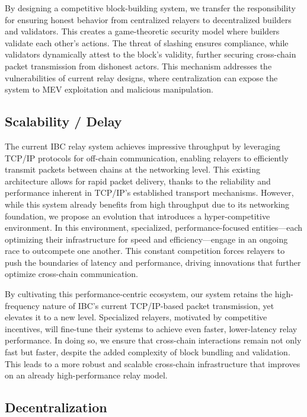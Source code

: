 \documentclass{article}
\begin{document}
By designing a competitive block-building system, we transfer the responsibility for ensuring honest behavior from centralized relayers to decentralized builders and validators. This creates a game-theoretic security model where builders validate each other's actions. The threat of slashing ensures compliance, while validators dynamically attest to the block's validity, further securing cross-chain packet transmission from dishonest actors. This mechanism addresses the vulnerabilities of current relay designs, where centralization can expose the system to MEV exploitation and malicious manipulation.

\subsection{Scalability / Delay}

The current IBC relay system achieves impressive throughput by leveraging TCP/IP protocols for off-chain communication, enabling relayers to efficiently transmit packets between chains at the networking level. This existing architecture allows for rapid packet delivery, thanks to the reliability and performance inherent in TCP/IP's established transport mechanisms. However, while this system already benefits from high throughput due to its networking foundation, we propose an evolution that introduces a hyper-competitive environment. In this environment, specialized, performance-focused entities---each optimizing their infrastructure for speed and efficiency---engage in an ongoing race to outcompete one another. This constant competition forces relayers to push the boundaries of latency and performance, driving innovations that further optimize cross-chain communication.

By cultivating this performance-centric ecosystem, our system retains the high-frequency nature of IBC's current TCP/IP-based packet transmission, yet elevates it to a new level. Specialized relayers, motivated by competitive incentives, will fine-tune their systems to achieve even faster, lower-latency relay performance. In doing so, we ensure that cross-chain interactions remain not only fast but faster, despite the added complexity of block bundling and validation. This leads to a more robust and scalable cross-chain infrastructure that improves on an already high-performance relay model.

\subsection{Decentralization}
\end{document}
